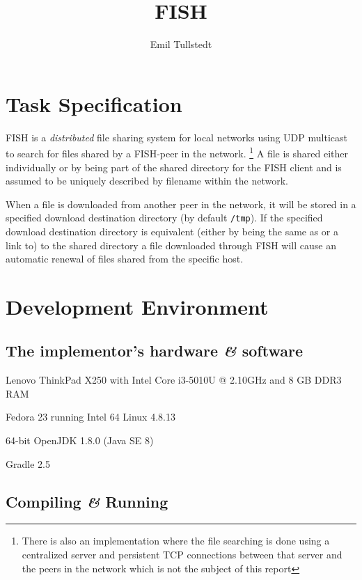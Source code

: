 \documentclass[11pt]{article}
\title{FISH}
\author{Emil Tullstedt}
\begin{document}
\maketitle
\tableofcontents

\newpage
\section{Task Specification}

FISH is a \textit{distributed} file sharing system for local networks using
UDP multicast to search for files shared by a FISH-peer in the network.
\footnote{There is also an implementation where the file searching is done using
a centralized server and persistent TCP connections between that server and
the peers in the network which is not the subject of this report} A file is
shared either individually or by being part
of the shared directory for the FISH client and is assumed to be uniquely
described by filename within the network.

When a file is downloaded from another peer in the network, it will be stored
in a specified download destination directory (by default \texttt{/tmp}). If
the specified download destination directory is equivalent (either by being the
same as or a link to) to the shared directory a file downloaded through FISH
will cause an automatic renewal of files shared from the specific host.

\section{Development Environment}

\subsection{The implementor's hardware \textit{\&} software}

\begin{description}[align=right,labelwidth=2cm]
\item[Computer] Lenovo ThinkPad X250 with Intel Core i3-5010U @ 2.10GHz and 8 GB DDR3
    RAM
\item[Operating System] Fedora 23 running Intel 64 Linux 4.8.13
\item[Java JRE \& JDK] 64-bit OpenJDK 1.8.0 (Java SE 8)
\item[Build system] Gradle 2.5
\end{description}

\subsection{Compiling \textit{\&} Running}
\label{subsec:compile}
\end{document}
